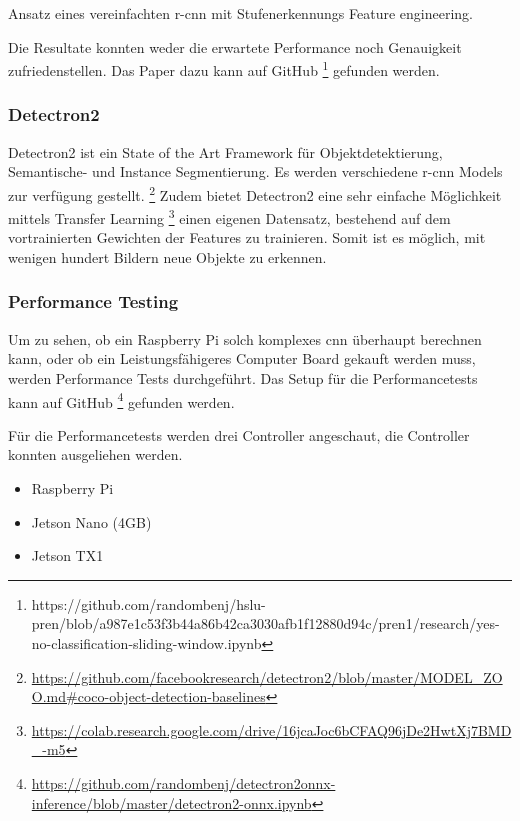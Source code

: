 {
Ansatz eines vereinfachten \acrshort{r-cnn} mit Stufenerkennungs Feature engineering.
}

Die Resultate konnten weder die erwartete Performance noch Genauigkeit zufriedenstellen.
Das Paper dazu kann auf GitHub \footnote{
https://github.com/randombenj/hslu-pren/blob/a987e1c53f3b44a86b42ca3030afb1f12880d94c/pren1/research/yes-no-classification-sliding-window.ipynb} gefunden werden.

\newpage

\subsubsection{Detectron2}

Detectron2 \cite{wu2019detectron2} ist ein State of the Art Framework für Objektdetektierung, Semantische- und Instance Segmentierung.
Es werden verschiedene \acrshort{r-cnn} Models zur verfügung gestellt. \footnote{
\url{https://github.com/facebookresearch/detectron2/blob/master/MODEL\_ZOO.md\#coco-object-detection-baselines}
}
Zudem bietet Detectron2 eine sehr einfache Möglichkeit mittels Transfer Learning \footnote{
\url{https://colab.research.google.com/drive/16jcaJoc6bCFAQ96jDe2HwtXj7BMD\_-m5}
}
einen eigenen Datensatz, bestehend auf dem vortrainierten Gewichten der Features zu trainieren.
Somit ist es möglich, mit wenigen hundert Bildern neue Objekte zu erkennen.

\subsubsection{Performance Testing}

Um zu sehen, ob ein Raspberry Pi solch komplexes \acrshort{cnn} überhaupt berechnen kann, oder ob ein
Leistungsfähigeres Computer Board gekauft werden muss, werden Performance Tests durchgeführt.
Das Setup für die Performancetests kann auf GitHub \footnote{\url{https://github.com/randombenj/detectron2onnx-inference/blob/master/detectron2-onnx.ipynb}} gefunden werden.

Für die Performancetests werden drei Controller angeschaut, die Controller konnten ausgeliehen werden.

\begin{itemize}
    \item Raspberry Pi
    \item Jetson Nano (4GB)
    \item Jetson TX1
\end{itemize}


